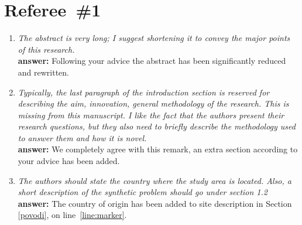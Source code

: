 \documentclass[final,3p]{elsarticle}
\begin{document}
\section*{Referee~\#1}

\begin{enumerate}
\item {\it    The abstract is very long; I suggest shortening it to convey the major points of this research.} \\
{\bf answer:} Following your advice  the abstract has been significantly reduced and rewritten.

\item {\it Typically, the last paragraph of the introduction section is reserved for describing the aim, innovation, general methodology of the research. This is missing from this manuscript. I like the fact that the authors present their research questions, but they also need to briefly describe the methodology used to answer them and how it is novel.} \\ 
{\bf  answer:} We completely agree with this remark, an extra section according to your advice has been added.

\item {\it The authors should state the country where the study area is located. Also, a short description of the synthetic problem should go under section 1.2} \\
{\bf  answer:} 
The country of origin has been added to site description  in Section \ref{povodi}, on line~\ref{line:marker}.


\end{enumerate}
\end{document}
